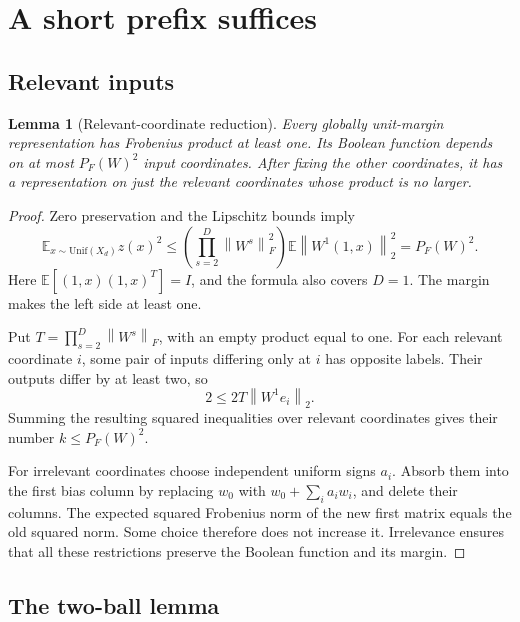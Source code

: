 \documentclass[11pt]{article}
\newtheorem{lemma}[theorem]{Lemma}
\theoremstyle{remark}
\newcommand{\E}{\mathbb E}
\newcommand{\norm}[1]{\left\lVert #1\right\rVert}
\begin{document}
\section{A short prefix suffices}

\subsection{Relevant inputs}

\begin{lemma}[Relevant-coordinate reduction]
\label{lem:junta}
Every globally unit-margin representation has Frobenius product at least one.
Its Boolean function depends on at most $P_F(W)^2$ input coordinates.
After fixing the other coordinates, it has a representation on just
the relevant coordinates whose product is no larger.
\end{lemma}
\begin{proof}
Zero preservation and the Lipschitz bounds imply
\[
 \E_{x\sim\mathrm{Unif}(X_d)}z(x)^2
 \le \left(\prod_{s=2}^D\norm{W^s}_F^2\right)
       \E\norm{W^1(1,x)}_2^2
 =P_F(W)^2.
\]
Here $\E[(1,x)(1,x)^T]=I$, and the formula also covers $D=1$.
The margin makes the left side at least one.

Put $T=\prod_{s=2}^D\norm{W^s}_F$, with an empty product equal to one.
For each relevant coordinate $i$, some pair of inputs differing only
at $i$ has opposite labels. Their outputs differ by at least two, so
\[
 2\le 2T\norm{W^1 e_i}_2.
\]
Summing the resulting squared inequalities over relevant coordinates
gives their number $k\le P_F(W)^2$.

For irrelevant coordinates choose independent uniform signs $a_i$.
Absorb them into the first bias column by replacing $w_0$ with
$w_0+\sum_i a_i w_i$, and delete their columns. The expected squared
Frobenius norm of the new first matrix equals the old squared norm.
Some choice therefore does not increase it. Irrelevance ensures that
all these restrictions preserve the Boolean function and its margin.
\end{proof}

\subsection{The two-ball lemma}
\end{document}
